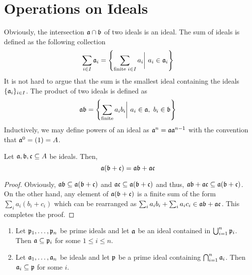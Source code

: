 \section{Operations on Ideals}

Obviously, the intersection $\mathfrak a\cap\mathfrak b$ of two ideals is an ideal. The sum of ideals is defined as the following collection
\begin{equation*}
    \sum_{i\in I}\mathfrak a_i = \left\{\sum_{\text{finite }i\in I}a_i\bigg\vert~a_i\in\mathfrak a_i\right\}
\end{equation*}
It is not hard to argue that the sum is the smallest ideal containing the ideals $\{\mathfrak a_i\}_{i\in I}$. The product of two ideals is defined as 
\begin{equation*}
    \mathfrak a\mathfrak b = \left\{\sum_{\text{finite}}a_ib_i\bigg\vert~a_i\in\mathfrak a,~b_i\in\mathfrak b\right\}
\end{equation*}
Inductively, we may define powers of an ideal as $\mathfrak a^n = \mathfrak a\mathfrak a^{n - 1}$ with the convention that $\mathfrak a^0 = (1) = A$.

\begin{proposition}
    Let $\mathfrak a,\mathfrak b,\mathfrak c\subseteq A$ be ideals. Then, 
    \begin{equation*}
        \mathfrak a(\mathfrak b + \mathfrak c) = \mathfrak a\mathfrak b + \mathfrak a\mathfrak c
    \end{equation*}
\end{proposition}
\begin{proof}
    Obviously, $\mathfrak a\mathfrak b\subseteq\mathfrak a(\mathfrak b + \mathfrak c)$ and $\mathfrak a\mathfrak c\subseteq\mathfrak a(\mathfrak b + \mathfrak c)$ and thus, $\mathfrak a\mathfrak b + \mathfrak a\mathfrak c\subseteq\mathfrak a(\mathfrak b + \mathfrak c)$. On the other hand, any element of $\mathfrak a(\mathfrak b + \mathfrak c)$ is a finite sum of the form $\sum_{i} a_i(b_i + c_i)$ which can be rearranged as $\sum_{i} a_ib_i + \sum_{i}a_ic_i\in\mathfrak a\mathfrak b + \mathfrak a\mathfrak c$. This completes the proof.
\end{proof}

\begin{proposition}
    \begin{enumerate}[label=(\alph*)]
    \item Let $\mathfrak p_1,\ldots,\mathfrak p_n$ be prime ideals and let $\mathfrak a$ be an ideal contained in $\bigcup_{i = 1}^n\mathfrak p_i$. Then $\mathfrak a\subseteq\mathfrak p_i$ for some $1\le i\le n$.
    \item Let $\mathfrak a_1,\ldots,\mathfrak a_n$ be ideals and let $\mathfrak p$ be a prime ideal containing $\bigcap_{i = 1}^n\mathfrak a_i$. Then $\mathfrak a_i\subseteq\mathfrak p$ for some $i$.
    \end{enumerate}
\end{proposition}

